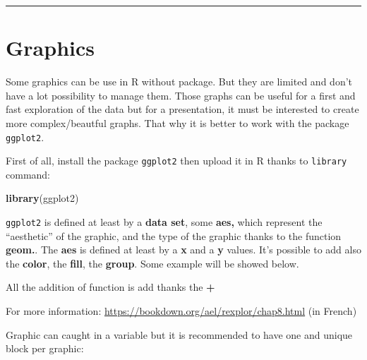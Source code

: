 \documentclass[
]{article}
\newenvironment{Shaded}{\begin{snugshade}}{\end{snugshade}}
\newcommand{\FunctionTok}[1]{\textcolor[rgb]{0.13,0.29,0.53}{\textbf{#1}}}
\newcommand{\NormalTok}[1]{#1}
\begin{document}
\begin{center}\rule{0.5\linewidth}{0.5pt}\end{center}

\hypertarget{graphics}{%
\section{Graphics}\label{graphics}}

Some graphics can be use in R without package. But they are limited and
don't have a lot possibility to manage them. Those graphs can be useful
for a first and fast exploration of the data but for a presentation, it
must be interested to create more complex/beautful graphs. That why it
is better to work with the package \texttt{ggplot2}.

First of all, install the package \texttt{ggplot2} then upload it in R
thanks to \texttt{library} command:

\begin{Shaded}
\begin{Highlighting}[]
\FunctionTok{library}\NormalTok{(ggplot2)}
\end{Highlighting}
\end{Shaded}

\texttt{ggplot2} is defined at least by a \textbf{data set}, some
\textbf{aes,} which represent the ``aesthetic'' of the graphic, and the
type of the graphic thanks to the function \textbf{geom.}. The
\textbf{aes} is defined at least by a \textbf{x} and a \textbf{y}
values. It's possible to add also the \textbf{color}, the \textbf{fill},
the \textbf{group}. Some example will be showed below.

All the addition of function is add thanks the \textbf{+}

For more information: \url{https://bookdown.org/ael/rexplor/chap8.html}
(in French)

Graphic can caught in a variable but it is recommended to have one and
unique block per graphic:
\end{document}

